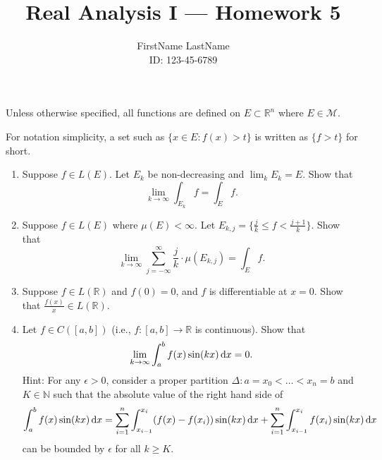 \documentclass{article}
\title{Real Analysis I --- Homework 5}
\author{FirstName LastName \\ ID: 123-45-6789}
\date{}
\begin{document}
\maketitle

Unless otherwise specified, all functions are defined on $E \subset \mathbb{R}^{n}$ where $E \in \mathcal{M}$.
\bigskip

For notation simplicity, a set such as $\{x \in E: f(x) > t\}$ is written as $\{f>t\}$ for short.

\begin{enumerate}

\item Suppose $f \in L(E)$. Let $E_{k}$ be non-decreasing and $\lim_{k} E_{k} = E$. Show that
\[
\lim_{k \to \infty} \int_{E_{k}} f = \int_{E} f .
\]




\item Suppose $f \in L(E)$ where $\mu(E) < \infty$. Let $E_{k,j} = \{\frac{j}{k} \le f < \frac{j+1}{k}\}$. Show that
\[
\lim_{k \to \infty} \sum_{j=-\infty}^{\infty} \frac{j}{k}\cdot \mu(E_{k,j}) = \int_{E} f.
\]




\item Suppose $f \in L(\mathbb{R})$ and $f(0) = 0$, and $f$ is differentiable at $x=0$. Show that $\frac{f(x)}{x} \in L(\mathbb{R})$.





\item Let $f \in C([a,b])$ (i.e., $f: [a,b] \to \mathbb{R}$ is continuous). Show that
\[
\lim_{k\to\infty} \int_{a}^{b} f(x) \sin(kx) \dif x = 0. 
\]
Hint: For any $\epsilon>0$, consider a proper partition $\Delta: a=x_{0}< \dots < x_{n}=b$ and $K \in \mathbb{N}$ such that the absolute value of the right hand side of  
\[
\int_{a}^{b} f(x) \sin(kx) \dif x = \sum_{i=1}^{n} \int_{x_{i-1}}^{x_{i}}(f(x) - f(x_{i})) \sin(kx) \dif x + \sum_{i=1}^{n} \int_{x_{i-1}}^{x_{i}} f(x_{i}) \sin(kx)\dif x
\]
can be bounded by $\epsilon$ for all $k \ge K$.


\end{enumerate}
\end{document}
